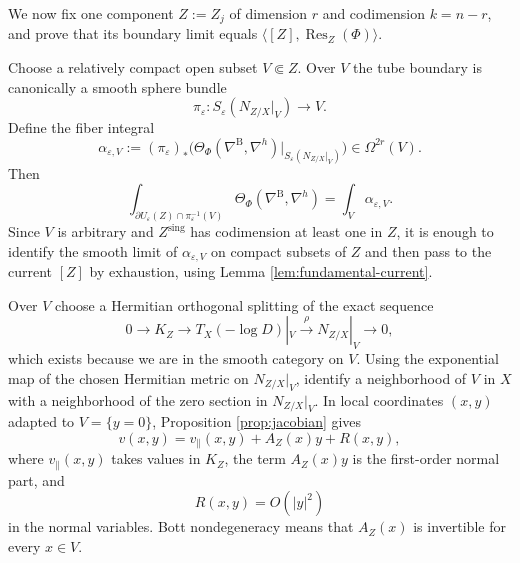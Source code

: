 \documentclass[12pt,a4paper,dvipsnames,x11names]{amsart}
\numberwithin{equation}{section}
\theoremstyle{plain}
\theoremstyle{definition}
\theoremstyle{remark}
\newcommand{\sing}{\mathrm{sing}}
\begin{document}
We now fix one component $Z:=Z_j$ of dimension $r$ and codimension $k=n-r$, and prove that its boundary limit equals $\langle [Z],\operatorname{Res}_Z(\Phi)\rangle$.

 
Choose a relatively compact open subset $V\Subset Z$. Over $V$ the tube boundary is canonically a smooth sphere bundle
\begin{equation}\label{eq:sphere-bundle-local}
\pi_\varepsilon:S_\varepsilon(N_{Z/X}|_V)\longrightarrow V.
\end{equation}
Define the fiber integral
\begin{equation}\label{eq:alpha-eps}
\alpha_{\varepsilon,V}:=(\pi_\varepsilon)_*\Big(\Theta_\Phi(\nabla^{\mathrm B},\nabla^h)|_{S_\varepsilon(N_{Z/X}|_V)}\Big)
\in \Omega^{2r}(V).
\end{equation}
Then
\begin{equation}\label{eq:fiber-int-local}
\int_{\partial U_{\varepsilon}(Z)\cap \pi_\varepsilon^{-1}(V)}\Theta_\Phi(\nabla^{\mathrm B},\nabla^h)=\int_V \alpha_{\varepsilon,V}.
\end{equation}
Since $V$ is arbitrary and $Z^\sing$ has codimension at least one in $Z$, it is enough to identify the smooth limit of $\alpha_{\varepsilon,V}$ on compact subsets of $Z$ and then pass to the current $[Z]$ by exhaustion, using Lemma \ref{lem:fundamental-current}.

 
Over $V$ choose a Hermitian orthogonal splitting of the exact sequence
\begin{equation}\label{eq:split-exact}
0\longrightarrow K_Z\longrightarrow T_X(-\log D)|_V\xrightarrow{\ \rho\ }N_{Z/X}|_V\longrightarrow 0,
\end{equation}
which exists because we are in the smooth category on $V$. Using the exponential map of the chosen Hermitian metric on $N_{Z/X}|_V$, identify a neighborhood of $V$ in $X$ with a neighborhood of the zero section in $N_{Z/X}|_V$. In local coordinates $(x,y)$ adapted to $V=\{y=0\}$, Proposition \ref{prop:jacobian} gives
\begin{equation}\label{eq:linearization-normal}
v(x,y)=v_{\parallel}(x,y)+A_Z(x)y+R(x,y),
\end{equation}
where $v_{\parallel}(x,y)$ takes values in $K_Z$, the term $A_Z(x)y$ is the first-order normal part, and
\begin{equation}\label{eq:R-quadratic}
R(x,y)=O(|y|^2)
\end{equation}
in the normal variables. Bott nondegeneracy means that $A_Z(x)$ is invertible for every $x\in V$.
\end{document}
